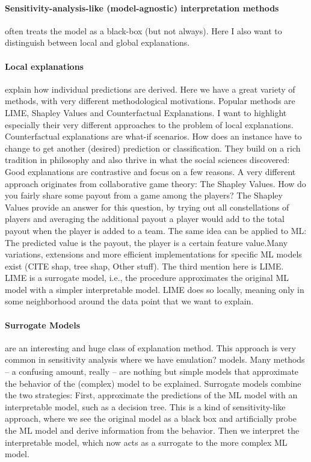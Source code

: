 \documentclass[runningheads]{llncs}
\begin{document}
\paragraph{Sensitivity-analysis-like (model-agnostic) interpretation methods} often treats the model as a black-box (but not always).
Here I also want to distinguish between local and global explanations.

\paragraph{Local explanations} explain how individual predictions are derived.
Here we have a great variety of methods, with very different methodological motivations.
Popular methods are LIME, Shapley Values and Counterfactual Explanations.
I want to highlight especially their very different approaches to the problem of local explanations.
Counterfactual explanations are what-if scenarios.
How does an instance have to change to get another (desired) prediction or classification.
They build on a rich tradition in philosophy and also thrive in what the social sciences discovered:
Good explanations are contrastive and focus on a few reasons.
A very different approach originates from collaborative game theory: The Shapley Values.
How do you fairly share some payout from a game among the players?
The Shapley Values provide an answer for this question, by trying out all constellations of players and averaging the additional payout a player would add to the total payout when the player is added to a team.
The same idea can be applied to ML: The predicted value is the payout, the player is a certain feature value.Many variations, extensions and more efficient implementations for specific ML models exist (CITE shap, tree shap, Other stuff).
The third mention here is LIME.
LIME is a surrogate model, i.e., the procedure approximates the original ML model with a simpler interpretable model.
LIME does so locally, meaning only in some neighborhood around the data point that we want to explain.

\paragraph{Surrogate Models} are an interesting and huge class of explanation method.
This approach is very common in sensitivity analysis where we have emulation? models.
Many methods -- a confusing amount, really -- are nothing but simple models that approximate the behavior of the (complex) model to be explained.
Surrogate models combine the two strategies:
First, approximate the predictions of the ML model with an interpretable model, such as a decision tree.
This is a kind of sensitivity-like approach, where we see the original model as a black box and artificially probe the ML model and derive information from the behavior.
Then we interpret the interpretable model, which now acts as a surrogate to the more complex ML model.
\end{document}

